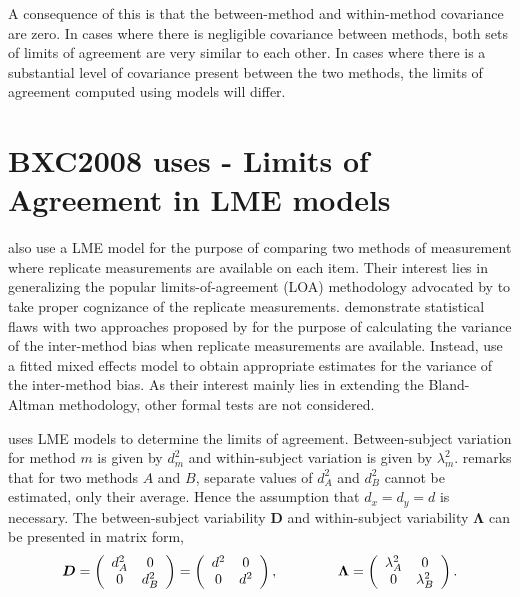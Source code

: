 \documentclass[12pt, a4paper]{report}
\theoremstyle{plain}
\theoremstyle{definition}
\theoremstyle{remark}
\begin{document}
	A consequence of this is that the between-method and within-method covariance are zero. In cases where there is negligible covariance between methods, both sets of limits of agreement are very similar to each other. In cases where there is a substantial level of covariance present between the two methods, the limits of agreement computed using models will differ.
	
	
	\newpage
	\section{BXC2008 uses - Limits of Agreement in LME models}
\citet{BXC2008} also use a LME model for the purpose of comparing two methods of measurement where replicate measurements are available on each item. Their interest lies in generalizing the popular limits-of-agreement (LOA) methodology advocated by \citet{BA86} to take proper cognizance of the replicate measurements. \citet{BXC2008} demonstrate statistical flaws with two approaches proposed by \citet{BA99} for the purpose of calculating the variance of the inter-method bias when replicate measurements are available. Instead, \citet{BXC2008} use a fitted mixed effects model to obtain appropriate estimates for the variance of the inter-method bias.  As their interest mainly lies in extending the Bland-Altman methodology, other formal tests are not considered.


	\citet{BXC2008} uses LME models to determine the limits of agreement. Between-subject variation for method $m$ is given by $d^2_{m}$ and within-subject variation is given by $\lambda^2_{m}$.  \citet{BXC2008} remarks that for two methods $A$ and $B$, separate values of $d^2_{A}$ and $d^2_{B}$ cannot be estimated, only their average. Hence the assumption that $d_{x}= d_{y}= d$ is necessary. The between-subject variability $\boldsymbol{D}$ and within-subject variability $\boldsymbol{\Lambda}$ can be presented in matrix form,\[
	\boldsymbol{D} = \left(%
	\begin{array}{cc}
	d^2_{A}& 0 \\
	0 & d^2_{B} \\
	\end{array}%
	\right)=\left(%
	\begin{array}{cc}
	d^2& 0 \\
	0 & d^2\\
	\end{array}%
	\right),
	\hspace{1.5cm}
	\boldsymbol{\Lambda} = \left(%
	\begin{array}{cc}
	\lambda^2_{A}& 0 \\
	0 & \lambda^2_{B} \\
	\end{array}%
	\right).
	\]
	
\end{document}
